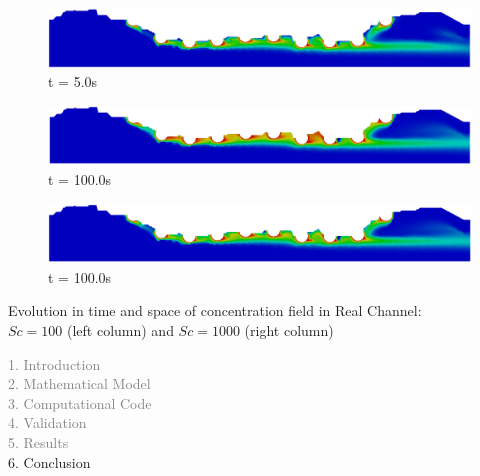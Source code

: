 \begin{frame}
\begin{figure}
     \begin{minipage}{.50\linewidth}
     \medskip
      \centering
      \includegraphics[scale=0.12]{images/conc1000_RealStrut5.png}\\
      \tiny t = 5.0s
     \end{minipage}
     \begin{minipage}{.50\linewidth}
      \centering
      \includegraphics[scale=0.12]{images/conc100_RealStrut8.png}\\
      \tiny t = 100.0s
     \end{minipage}%
     \begin{minipage}{.50\linewidth}
      \centering
      \includegraphics[scale=0.12]{images/conc1000_RealStrut8.png}\\
      \tiny t = 100.0s
     \end{minipage}
\end{figure}
\vspace{-0.2cm}
\centering \scriptsize Evolution in time and space of concentration field in Real Channel:\\
                 $Sc=100$ (left column) and $Sc=1000$ (right column)
\end{frame}




\begin{frame}
  \vspace{-1cm}
  \textcolor{gray}{1. Introduction}\\[0.1cm]
  \textcolor{gray}{2. Mathematical Model}\\[0.1cm]
  \textcolor{gray}{3. Computational Code}\\[0.1cm]
  \textcolor{gray}{4. Validation}\\[0.1cm]
  \textcolor{gray}{5. Results}\\[0.1cm]
  6. Conclusion
\end{frame}

